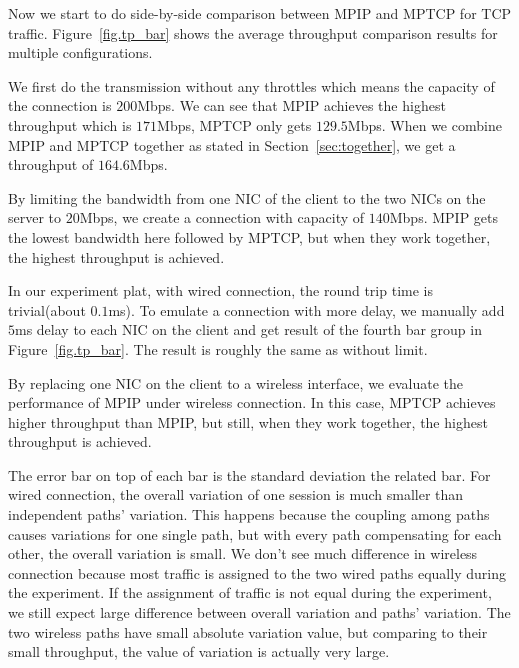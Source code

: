 Now we start to do side-by-side comparison between MPIP and MPTCP for TCP traffic. Figure~\ref{fig.tp_bar} shows the average throughput comparison results for multiple configurations.

We first do the transmission without any throttles which means the capacity of the connection is $200$Mbps. We can see that MPIP achieves the highest throughput which is $171$Mbps, MPTCP only gets $129.5$Mbps. When we combine MPIP and MPTCP together as stated in Section~\ref{sec:together}, we get a throughput of $164.6$Mbps.


By limiting the bandwidth from one NIC of the client to the two NICs on the server to $20$Mbps, we create a connection with capacity of $140$Mbps. MPIP gets the lowest bandwidth here followed by MPTCP, but when they work together, the highest throughput is achieved.

In our experiment plat, with wired connection, the round trip time is trivial(about $0.1$ms). To emulate a connection with more delay, we manually add $5$ms delay to each NIC on the client and get result of the fourth bar group in Figure~\ref{fig.tp_bar}. The result is roughly the same as without limit.

By replacing one NIC on the client to a wireless interface, we evaluate the performance of MPIP under wireless connection. In this case, MPTCP achieves higher throughput than MPIP, but still, when they work together, the highest throughput is achieved.

The error bar on top of each bar is the standard deviation the related bar. For wired connection, the overall variation of one session is much smaller than independent paths' variation. This happens because the coupling among paths causes variations for one single path, but with every path compensating for each other, the overall variation is small. We don't see much difference in wireless connection because most traffic is assigned to the two wired paths equally during the experiment. If the assignment of traffic is not equal during the experiment, we still expect large difference between overall variation and paths' variation. The two wireless paths have small absolute variation value, but comparing to their small throughput, the value of variation is actually very large.

